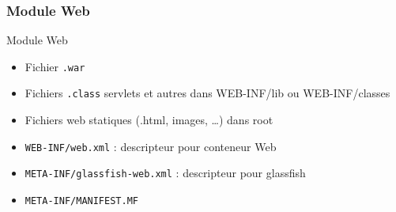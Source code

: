 \documentclass[english, french]{beamer}
\begin{document}
\begin{frame}
	\frametitle{Module Web}
	\begin{block}{Module Web}
		\begin{itemize}
			\item Fichier \texttt{.war}
			\item Fichiers \texttt{.class} servlets et autres dans WEB-INF/lib ou WEB-INF/classes
			\item Fichiers web statiques (.html, images, …) dans root
			\item \texttt{WEB-INF/web.xml} : descripteur pour conteneur Web
			\item \texttt{META-INF/glassfish-web.xml} : descripteur pour glassfish
			\item \texttt{META-INF/MANIFEST.MF}
		\end{itemize}
	\end{block}
\end{frame}
\end{document}
